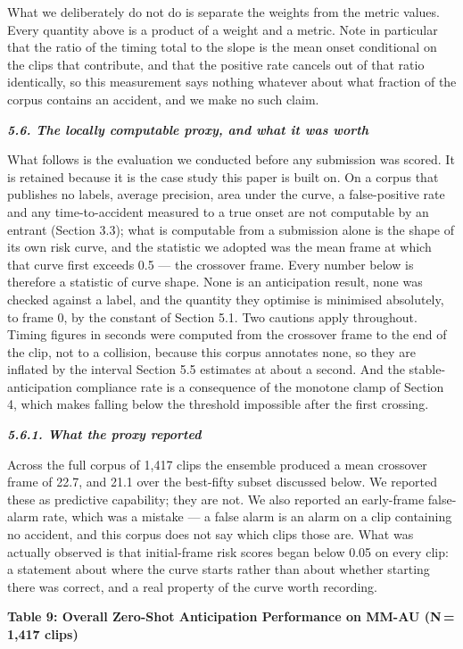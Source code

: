 What we deliberately do not do is separate the weights from the metric values. Every quantity above is a product of a weight and a metric. Note in particular that the ratio of the timing total to the slope is the mean onset conditional on the clips that contribute, and that the positive rate cancels out of that ratio identically, so this measurement says nothing whatever about what fraction of the corpus contains an accident, and we make no such claim.

\emph{\textbf{5.6. The locally computable proxy, and what it was worth}}

What follows is the evaluation we conducted before any submission was scored. It is retained because it is the case study this paper is built on. On a corpus that publishes no labels, average precision, area under the curve, a false-positive rate and any time-to-accident measured to a true onset are not computable by an entrant (Section 3.3); what is computable from a submission alone is the shape of its own risk curve, and the statistic we adopted was the mean frame at which that curve first exceeds 0.5 --- the crossover frame. Every number below is therefore a statistic of curve shape. None is an anticipation result, none was checked against a label, and the quantity they optimise is minimised absolutely, to frame 0, by the constant of Section 5.1. Two cautions apply throughout. Timing figures in seconds were computed from the crossover frame to the end of the clip, not to a collision, because this corpus annotates none, so they are inflated by the interval Section 5.5 estimates at about a second. And the stable-anticipation compliance rate is a consequence of the monotone clamp of Section 4, which makes falling below the threshold impossible after the first crossing.

\emph{\textbf{5.6.1. What the proxy reported}}

Across the full corpus of 1,417 clips the ensemble produced a mean crossover frame of 22.7, and 21.1 over the best-fifty subset discussed below. We reported these as predictive capability; they are not. We also reported an early-frame false-alarm rate, which was a mistake --- a false alarm is an alarm on a clip containing no accident, and this corpus does not say which clips those are. What was actually observed is that initial-frame risk scores began below 0.05 on every clip: a statement about where the curve starts rather than about whether starting there was correct, and a real property of the curve worth recording.

\textbf{Table 9: Overall Zero-Shot Anticipation Performance on MM-AU (N\,=\,1,417 clips)}

